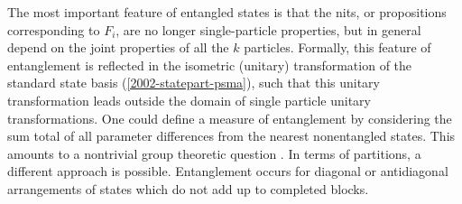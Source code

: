 The most important feature of entangled states is that the nits,
or propositions corresponding to $F_i$, are no longer single-particle properties,
but in general depend on the joint properties of all the $k$ particles.
Formally,
this feature of entanglement is reflected in the isometric (unitary) transformation
of the standard state basis (\ref{2002-statepart-psma}), such that
this unitary transformation leads outside the domain of single particle
unitary transformations.
One could define a measure of entanglement by considering the sum total
of all parameter differences from the nearest nonentangled states.
This amounts to a nontrivial group theoretic question \cite{dirl-svozil-2002}.
In terms of partitions, a different approach is possible.
Entanglement occurs for diagonal or antidiagonal arrangements of states
which do not add up to completed blocks.

